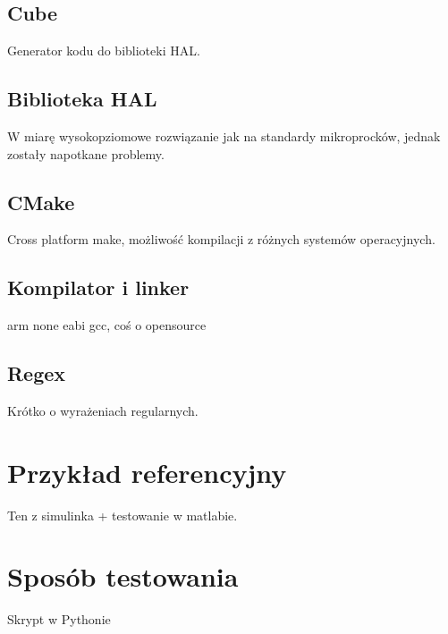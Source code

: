 \subsection{Cube} \label{sec:cube}
Generator kodu do biblioteki HAL.

\subsection{Biblioteka HAL} \label{sec:hal}
W miarę wysokopziomowe rozwiązanie jak na standardy mikroprocków, jednak zostały napotkane problemy.

\subsection{CMake} \label{sec:cmake}
Cross platform make, możliwość kompilacji z różnych systemów operacyjnych.

\subsection{Kompilator i linker} \label{sec:gcc}
arm none eabi gcc, coś o opensource

\subsection{Regex} \label{sec:regex}
Krótko o wyrażeniach regularnych.

\section{Przykład referencyjny} \label{sec:ref}
Ten z simulinka + testowanie w matlabie.

\section{Sposób testowania} \label{sec:tests}
Skrypt w Pythonie
